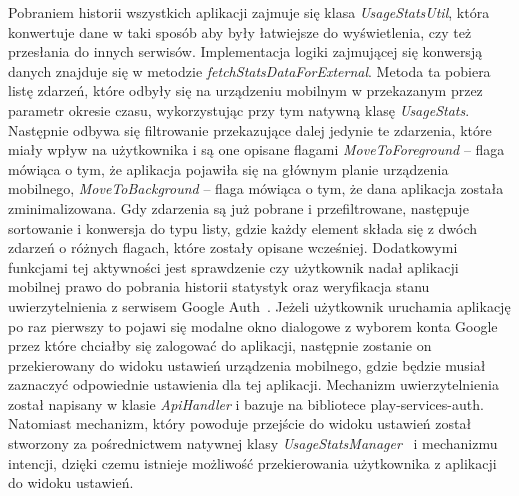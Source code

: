 \documentclass[a4paper,twoside,12pt]{book}
\begin{document}
Pobraniem historii wszystkich aplikacji zajmuje się klasa \textit{UsageStatsUtil}, która konwertuje dane w taki sposób aby były łatwiejsze do wyświetlenia, czy też przesłania do innych serwisów. Implementacja logiki zajmującej się konwersją danych znajduje się w metodzie \textit{fetchStatsDataForExternal}. Metoda ta pobiera listę zdarzeń, które odbyły się na urządzeniu mobilnym w przekazanym przez parametr okresie czasu, wykorzystując przy tym natywną klasę \textit{UsageStats}. Następnie odbywa się filtrowanie przekazujące dalej jedynie te zdarzenia, które miały wpływ na użytkownika i są one opisane flagami \textit{MoveToForeground} -- flaga mówiąca o tym, że aplikacja pojawiła się na głównym planie urządzenia mobilnego, \textit{MoveToBackground} -- flaga mówiąca o tym, że dana aplikacja została zminimalizowana. Gdy zdarzenia są już pobrane i przefiltrowane, następuje sortowanie i konwersja do typu listy, gdzie każdy element składa się z dwóch zdarzeń o różnych flagach, które zostały opisane wcześniej. Dodatkowymi funkcjami tej aktywności jest sprawdzenie czy użytkownik nadał aplikacji mobilnej prawo do pobrania historii statystyk oraz weryfikacja stanu uwierzytelnienia z serwisem Google Auth~\cite{auth_api}. Jeżeli użytkownik uruchamia aplikację po raz pierwszy to pojawi się modalne okno dialogowe z wyborem konta Google przez które chciałby się zalogować do aplikacji, następnie zostanie on przekierowany do widoku ustawień urządzenia mobilnego, gdzie będzie musiał zaznaczyć odpowiednie ustawienia dla tej aplikacji. Mechanizm uwierzytelnienia został napisany w klasie \textit{ApiHandler} i bazuje na bibliotece play-services-auth. Natomiast mechanizm, który powoduje przejście do widoku ustawień został stworzony za pośrednictwem natywnej klasy \textit{UsageStatsManager}~\cite{usage_stats_api} i mechanizmu intencji, dzięki czemu istnieje możliwość przekierowania użytkownika z aplikacji do widoku ustawień. 
\end{document}
